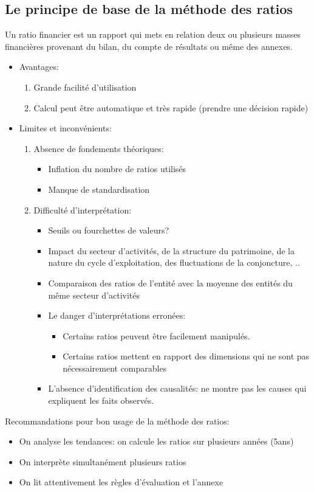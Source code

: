 \documentclass{article}
\begin{document}
\subsection{Le principe de base de la méthode des ratios}
Un ratio financier est un rapport qui mets en relation deux ou plusieurs masses financières provenant du bilan, du compte de résultats ou même des annexes. 
\begin{itemize}
    \item Avantages:
    \begin{enumerate}
        \item Grande facilité d'utilisation
        \item Calcul peut être automatique et très rapide (prendre une décision rapide)
    \end{enumerate}
    \item Limites et inconvénients:
    \begin{enumerate}
        \item Absence de fondements théoriques:
        \begin{itemize}
            \item Inflation du nombre de ratios utilisés
            \item Manque de standardisation
        \end{itemize}
        \item Difficulté d'interprétation:
        \begin{itemize}
            \item Seuils ou fourchettes de valeurs? 
            \item Impact du secteur d'activités, de la structure du patrimoine, de la nature du cycle d'exploitation, des fluctuations de la conjoncture, ..
            \item Comparaison des ratios de l'entité avec la moyenne des entités du même secteur d'activités
            \item Le danger d'interprétations erronées: 
            \begin{itemize}
                \item Certains ratios peuvent être facilement manipulés.
                \item Certains ratios mettent en rapport des dimensions qui ne sont pas nécessairement comparables
            \end{itemize}
            \item L'absence d'identification des causalités: ne montre pas les causes qui expliquent les faits observés.
        \end{itemize}
    \end{enumerate}
\end{itemize}


 Recommandations pour bon usage de la méthode des ratios:
 \begin{itemize}
     \item On analyse les tendances: on calcule les ratios sur plusieurs années (5ans)
     \item On interprète simultanément plusieurs ratios
     \item On lit attentivement les règles d'évaluation et l'annexe
 \end{itemize}
 
\end{document}
